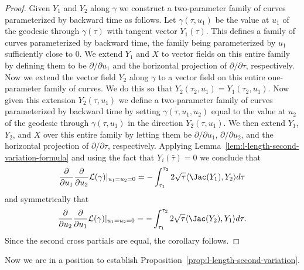 \begin{proof}
Given $Y_1$ and $Y_2$ along $\gamma$ we construct a two-parameter
family of curves parameterized by backward time as follows. Let
$\gamma(\tau,u_1)$ be the value at $u_1$ of the geodesic through
$\gamma(\tau)$ with tangent vector $Y_1(\tau)$. This defines a
family of curves parameterized by backward time, the family being
parameterized by  $u_1$ sufficiently close to $0$. We extend
 $Y_1$ and $X$ to vector fields on this entire family by defining them to be
 $\partial/\partial u_1$ and the
horizontal projection of $\partial/\partial \tau$, respectively.
 Now we
extend the vector field $Y_2$ along $\gamma$ to a vector field on
this entire one-parameter family of curves. We do this so that
$Y_2(\tau_2,u_1)=Y_1(\tau_2,u_1)$. Now given this extension
$Y_2(\tau,u_1)$ we define a two-parameter family of curves
parameterized by backward time
 by setting $\gamma(\tau,u_1,u_2)$ equal to the value at $u_2$ of the geodesic
 through $\gamma(\tau,u_1)$ in the direction $Y_2(\tau,u_1)$.
 We then extend  $Y_1$, $Y_2$, and $X$ over this entire family by letting them be
 $\partial/\partial u_1$,
$\partial/\partial u_2$, and the horizontal projection of $\partial/ \partial
\tau$, respectively. Applying Lemma~\ref{lem:l-length-second-variation-formula} and using the fact that
$Y_i(\bar\tau)=0$ we conclude that
$$\frac{\partial}{\partial u_1}\frac{\partial}{\partial u_2}{\mathcal L}(\gamma)|_{u_1=u_2=0}= -\int_{\tau_1}^{\tau_2}2\sqrt{\tau}\langle
\Jac(Y_1),Y_2\rangle d\tau$$ and symmetrically that
$$\frac{\partial}{\partial u_2}\frac{\partial}{\partial u_1}{\mathcal L}(\gamma)|_{u_1=u_2=0}= -\int_{\tau_1}^{\tau_2}2\sqrt{\tau}\langle
\Jac(Y_2),Y_1\rangle d\tau.$$ Since the second cross partials
are equal, the corollary follows.
\end{proof}





Now we are in a position to establish Proposition~\ref{prop:l-length-second-variation}.


